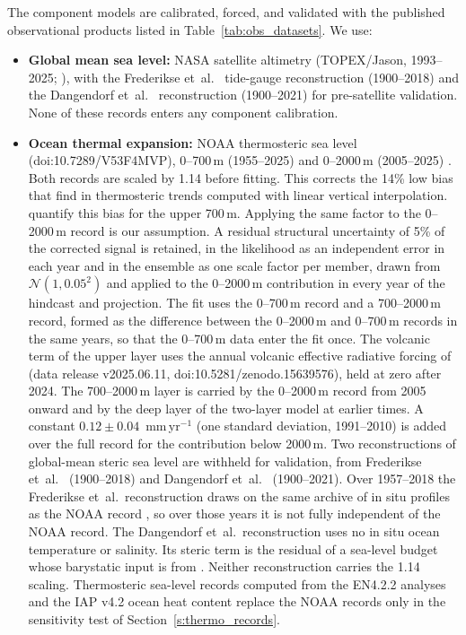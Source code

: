 \documentclass[12pt]{article}
\begin{document}
The component models are calibrated, forced, and validated with the published observational products listed in Table~\ref{tab:obs_datasets}. We use:
\begin{itemize}
\item \textbf{Global mean sea level:} NASA satellite altimetry (TOPEX/Jason, 1993--2025; \citealp{Beckley2017,Hamlington2020}), with the Frederikse et~al.~\citeyearpar{Frederikse2020} tide-gauge reconstruction (1900--2018) and the Dangendorf et~al.~\citeyearpar{Dangendorf2024} reconstruction (1900--2021) for pre-satellite validation. None of these records enters any component calibration.
\item \textbf{Ocean thermal expansion:} NOAA thermosteric sea level (doi:10.7289/V53F4MVP), 0--700\,m (1955--2025) and 0--2000\,m (2005--2025) \citep{Levitus2012}. Both records are scaled by 1.14 before fitting. This corrects the 14\% low bias that \citet{Li2022} find in thermosteric trends computed with linear vertical interpolation. \citet{Li2022} quantify this bias for the upper 700\,m. Applying the same factor to the 0--2000\,m record is our assumption. A residual structural uncertainty of 5\% of the corrected signal is retained, in the likelihood as an independent error in each year and in the ensemble as one scale factor per member, drawn from $\mathcal{N}(1, 0.05^2)$ and applied to the 0--2000\,m contribution in every year of the hindcast and projection. The fit uses the 0--700\,m record and a 700--2000\,m record, formed as the difference between the 0--2000\,m and 0--700\,m records in the same years, so that the 0--700\,m data enter the fit once. The volcanic term of the upper layer uses the annual volcanic effective radiative forcing of \citet{Forster2025} (data release v2025.06.11, doi:10.5281/zenodo.15639576), held at zero after 2024. The 700--2000\,m layer is carried by the 0--2000\,m record from 2005 onward and by the deep layer of the two-layer model at earlier times. A constant $0.12 \pm 0.04$~mm\,yr$^{-1}$ (one standard deviation, 1991--2010) \citep{Desbruyeres2016} is added over the full record for the contribution below 2000\,m. Two reconstructions of global-mean steric sea level are withheld for validation, from Frederikse et~al.~\citeyearpar{Frederikse2020} (1900--2018) and Dangendorf et~al.~\citeyearpar{Dangendorf2024} (1900--2021). Over 1957--2018 the Frederikse et~al.~reconstruction draws on the same archive of in situ profiles as the NOAA record \citep{Levitus2012, Ishii2017, Cheng2016}, so over those years it is not fully independent of the NOAA record. The Dangendorf et~al.~reconstruction uses no in situ ocean temperature or salinity. Its steric term is the residual of a sea-level budget whose barystatic input is from \citet{Frederikse2020}. Neither reconstruction carries the 1.14 scaling. Thermosteric sea-level records computed from the EN4.2.2 analyses \citep{Good2013} and the IAP v4.2 ocean heat content \citep{Cheng2017} replace the NOAA records only in the sensitivity test of Section~\ref{s:thermo_records}.

\end{itemize}
\end{document}
